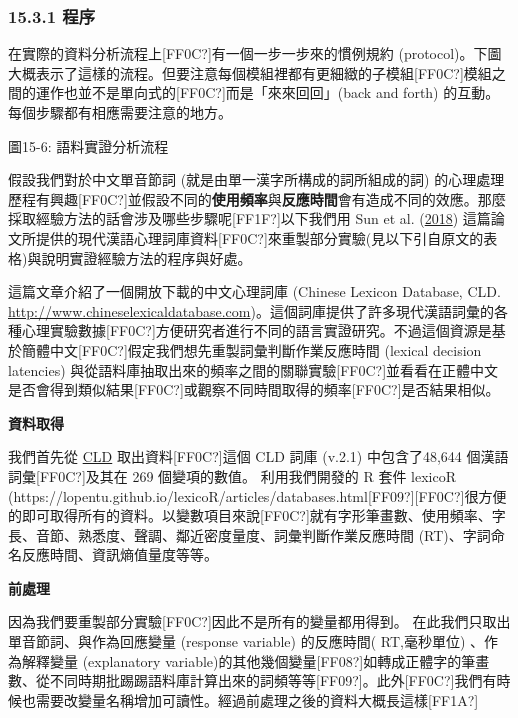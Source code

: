 \subsubsection{15.3.1 程序}

在實際的資料分析流程上[FF0C?]有一個一步一步來的慣例規約 (protocol)。下圖大概表示了這樣的流程。但要注意每個模組裡都有更細緻的子模組[FF0C?]模組之間的運作也並不是單向式的[FF0C?]而是「來來回回」(back and forth) 的互動。每個步驟都有相應需要注意的地方。


圖15-6: 語料實證分析流程

假設我們對於中文單音節詞 (就是由單一漢字所構成的詞所組成的詞) 的心理處理歷程有興趣[FF0C?]並假設不同的\textbf{使用頻率}與\textbf{反應時間}會有造成不同的效應。那麼採取經驗方法的話會涉及哪些步驟呢[FF1F?]以下我們用 Sun et al. (\hyperlink{bookmarkid1mrcu09}{2018}) 這篇論文所提供的現代漢語心理詞庫資料[FF0C?]來重製部分實驗(見以下引自原文的表格)與說明實證經驗方法的程序與好處。

  
 

\citet{SunEtAl2018} 這篇文章介紹了一個開放下載的中文心理詞庫 (Chinese Lexicon Database, CLD.  \url{http://www.chineselexicaldatabase.com})。這個詞庫提供了許多現代漢語詞彙的各種心理實驗數據[FF0C?]方便研究者進行不同的語言實證研究。不過這個資源是基於簡體中文[FF0C?]假定我們想先重製詞彙判斷作業反應時間 (lexical decision latencies) 與從語料庫抽取出來的頻率之間的關聯實驗[FF0C?]並看看在正體中文是否會得到類似結果[FF0C?]或觀察不同時間取得的頻率[FF0C?]是否結果相似。

\textbf{資料取得}

我們首先從 \href{http://www.chineselexicaldatabase.com/}{CLD} 取出資料[FF0C?]這個 CLD 詞庫 (v.2.1) 中包含了48,644 個漢語詞彙[FF0C?]及其在 269 個變項的數值。 利用我們開發的 R 套件 lexicoR (https://lopentu.github.io/lexicoR/articles/databases.html[FF09?][FF0C?]很方便的即可取得所有的資料。以變數項目來說[FF0C?]就有字形筆畫數、使用頻率、字長、音節、熟悉度、聲調、鄰近密度量度、詞彙判斷作業反應時間 (RT)、字詞命名反應時間、資訊熵值量度等等。 

\textbf{前處理}

因為我們要重製部分實驗[FF0C?]因此不是所有的變量都用得到。 在此我們只取出單音節詞、與作為回應變量 (response variable) 的反應時間( RT,毫秒單位) 、作為解釋變量 (explanatory variable)的其他幾個變量[FF08?]如轉成正體字的筆畫數、從不同時期批踢踢語料庫計算出來的詞頻等等[FF09?]。此外[FF0C?]我們有時候也需要改變量名稱增加可讀性。經過前處理之後的資料大概長這樣[FF1A?]

